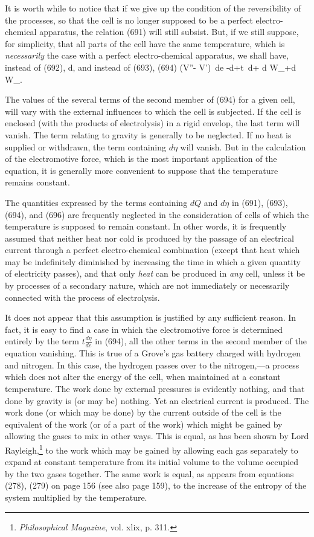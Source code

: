 \documentclass[12pt]{article}
\begin{document}
It is worth while to notice that if we give up the condition of the reversibility of the processes, so that the cell is no longer supposed to be a perfect electro-chemical apparatus, the relation (691) will still subsist. But, if we still suppose, for simplicity, that all parts of the cell have the same temperature, which is \textit{necessarily} the case with a perfect electro-chemical apparatus, we shall have, instead of (692),
\eqs d\eta \geq {},   \label{695} \eqe
and instead of (693), (694)
\eqs (V''- V')\, de \leq  -d\epsilon+t \,d\eta + d W_+d W_. \label{696} \eqe

The values of the several terms of the second member of (694) for a given cell, will vary with the external influences to which the cell is subjected. If the cell is enclosed (with the products of electrolysis) in a rigid envelop, the last term will vanish. The term relating to gravity is generally to be neglected.  If no heat is supplied or withdrawn, the term containing $d\eta$ will vanish. But in the calculation of the electromotive force, which is the most important application of the equation, it is generally more convenient to suppose that the temperature remains constant.

The quantities expressed by the terms containing $dQ$ and $d\eta$ in (691), (693), (694), and (696) are frequently neglected in the consideration of cells of which the temperature is supposed to remain constant. In other words, it is frequently assumed that neither heat nor cold is produced by the passage of an electrical current through a perfect electro-chemical combination (except that heat which may be indefinitely diminished by increasing the time in which a given quantity of electricity passes), and that only \textit{heat} can be produced in \textit{any} cell, unless it be by processes of a secondary nature, which are not immediately or necessarily connected with the process of electrolysis.

It does not appear that this assumption is justified by any sufficient reason. In fact, it is easy to find a case in which the electromotive force is determined entirely by the term $t\frac{d\eta}{de}$ in (694), all the other terms in the second member of the equation vanishing. This is true of a Grove's gas battery charged with hydrogen and nitrogen. In this case, the hydrogen passes over to the nitrogen,---a process which does not alter the energy of the cell, when maintained at a constant temperature. The work done by external pressures is evidently nothing, and that done by gravity is (or may be) nothing. Yet an electrical current is produced. The work done (or which may be done) by the current outside of the cell is the equivalent of the work (or of a part of the work) which might be gained by allowing the gases to mix in other ways. This is equal, as has been shown by Lord Rayleigh,\footnote{\textit{Philosophical Magazine}, vol. xlix, p. 311.} to the work which may be gained by allowing each gas separately to expand at constant temperature from its initial volume to the volume occupied by the two gases together. The same work is equal, as appears from equations (278), (279) on page 156 (see also page 159), to the increase of the entropy of the system multiplied by the temperature.
\end{document}
